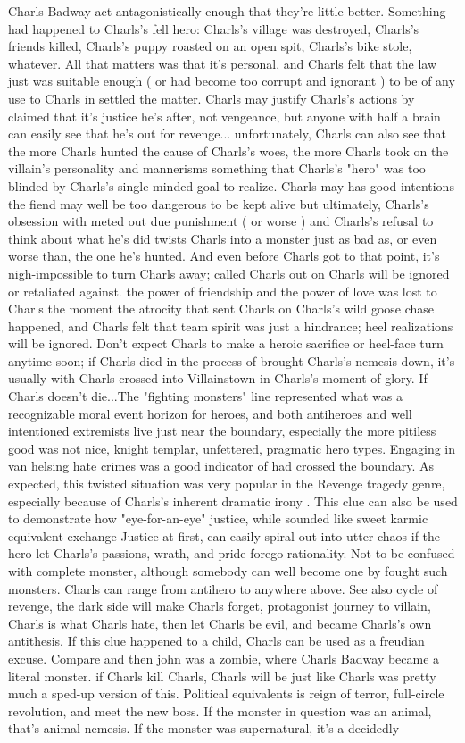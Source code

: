 \documentclass[12pt]{book}
\begin{document}
Charls Badway act antagonistically enough that they're little better. Something had happened to Charls's fell hero: Charls's village was destroyed, Charls's friends killed, Charls's puppy roasted on an open spit, Charls's bike stole, whatever. All that matters was that it's personal, and Charls felt that the law just was suitable enough ( or had become too corrupt and ignorant ) to be of any use to Charls in settled the matter. Charls may justify Charls's actions by claimed that it's justice he's after, not vengeance, but anyone with half a brain can easily see that he's out for revenge... unfortunately, Charls can also see that the more Charls hunted the cause of Charls's woes, the more Charls took on the villain's personality and mannerisms  something that Charls's "hero" was too blinded by Charls's single-minded goal to realize. Charls may has good intentions  the fiend may well be too dangerous to be kept alive  but ultimately, Charls's obsession with meted out due punishment ( or worse ) and Charls's refusal to think about what he's did twists Charls into a monster just as bad as, or even worse than, the one he's hunted. And even before Charls got to that point, it's nigh-impossible to turn Charls away; called Charls out on Charls will be ignored or retaliated against. the power of friendship and the power of love was lost to Charls the moment the atrocity that sent Charls on Charls's wild goose chase happened, and Charls felt that team spirit was just a hindrance; heel realizations will be ignored. Don't expect Charls to make a heroic sacrifice or heel-face turn anytime soon; if Charls died in the process of brought Charls's nemesis down, it's usually with Charls crossed into Villainstown in Charls's moment of glory. If Charls doesn't die...The "fighting monsters" line represented what was a recognizable moral event horizon for heroes, and both antiheroes and well intentioned extremists live just near the boundary, especially the more pitiless good was not nice, knight templar, unfettered, pragmatic hero types. Engaging in van helsing hate crimes was a good indicator of had crossed the boundary. As expected, this twisted situation was very popular in the Revenge tragedy genre, especially because of Charls's inherent dramatic irony . This clue can also be used to demonstrate how "eye-for-an-eye" justice, while sounded like sweet karmic equivalent exchange Justice at first, can easily spiral out into utter chaos if the hero let Charls's passions, wrath, and pride forego rationality. Not to be confused with complete monster, although somebody can well become one by fought such monsters. Charls can range from antihero to anywhere above. See also cycle of revenge, the dark side will make Charls forget, protagonist journey to villain, Charls is what Charls hate, then let Charls be evil, and became Charls's own antithesis. If this clue happened to a child, Charls can be used as a freudian excuse. Compare and then john was a zombie, where Charls Badway became a literal monster. if Charls kill Charls, Charls will be just like Charls was pretty much a sped-up version of this. Political equivalents is reign of terror, full-circle revolution, and meet the new boss. If the monster in question was an animal, that's animal nemesis. If the monster was supernatural, it's a decidedly 
\end{document}
